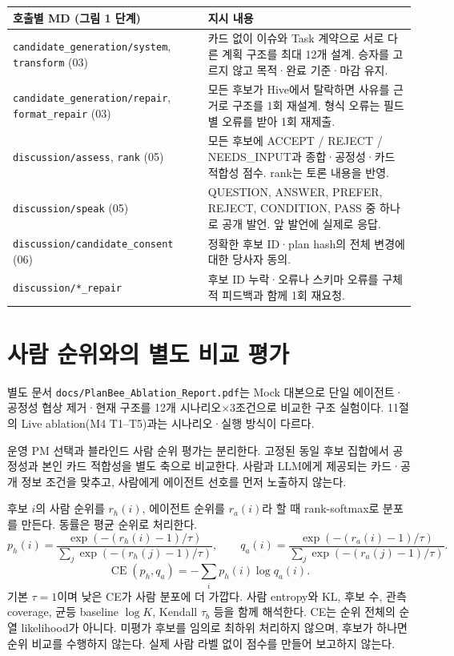 \documentclass[11pt,a4paper]{article}
\begin{document}
\vspace{4mm}
\begin{tabularx}{\linewidth}{@{}p{52mm}Y@{}}\toprule
호출별 MD (그림 1 단계) & 지시 내용\\\midrule
\texttt{candidate\_generation/system}, \texttt{transform} (03) & 카드 없이 이슈와 Task 계약으로 서로 다른 계획 구조를 최대 12개 설계. 승자를 고르지 않고 목적·완료 기준·마감 유지.\\
\texttt{candidate\_generation/repair}, \texttt{format\_repair} (03) & 모든 후보가 Hive에서 탈락하면 사유를 근거로 구조를 1회 재설계. 형식 오류는 필드별 오류를 받아 1회 재제출.\\
\texttt{discussion/assess}, \texttt{rank} (05) & 모든 후보에 ACCEPT / REJECT / NEEDS\_INPUT과 종합·공정성·카드 적합성 점수. rank는 토론 내용을 반영.\\
\texttt{discussion/speak} (05) & QUESTION, ANSWER, PREFER, REJECT, CONDITION, PASS 중 하나로 공개 발언. 앞 발언에 실제로 응답.\\
\texttt{discussion/candidate\_consent} (06) & 정확한 후보 ID·plan hash의 전체 변경에 대한 당사자 동의.\\
\texttt{discussion/*\_repair} & 후보 ID 누락·오류나 스키마 오류를 구체적 피드백과 함께 1회 재요청.\\\bottomrule
\end{tabularx}

\newpage
\section{사람 순위와의 별도 비교 평가}
{\small 별도 문서 \texttt{docs/PlanBee\_Ablation\_Report.pdf}는 Mock 대본으로 단일 에이전트·공정성 협상 제거·현재 구조를 12개 시나리오×3조건으로 비교한 구조 실험이다. 11절의 Live ablation(M4 T1--T5)과는 시나리오·실행 방식이 다르다.}


운영 PM 선택과 블라인드 사람 순위 평가는 분리한다. 고정된 동일 후보 집합에서 공정성과 본인 카드 적합성을 별도 축으로 비교한다. 사람과 LLM에게 제공되는 카드·공개 정보 조건을 맞추고, 사람에게 에이전트 선호를 먼저 노출하지 않는다.

후보 $i$의 사람 순위를 $r_h(i)$, 에이전트 순위를 $r_a(i)$라 할 때 rank-softmax로 분포를 만든다. 동률은 평균 순위로 처리한다.
\[
p_h(i)=\frac{\exp(-(r_h(i)-1)/\tau)}{\sum_j\exp(-(r_h(j)-1)/\tau)},\qquad
q_a(i)=\frac{\exp(-(r_a(i)-1)/\tau)}{\sum_j\exp(-(r_a(j)-1)/\tau)}.
\]
\[
\operatorname{CE}(p_h,q_a)=-\sum_i p_h(i)\log q_a(i).
\]
기본 $\tau=1$이며 낮은 CE가 사람 분포에 더 가깝다. 사람 entropy와 KL, 후보 수, 관측 coverage, 균등 baseline $\log K$, Kendall $\tau_b$ 등을 함께 해석한다. CE는 순위 전체의 순열 likelihood가 아니다. 미평가 후보를 임의로 최하위 처리하지 않으며, 후보가 하나면 순위 비교를 수행하지 않는다. 실제 사람 라벨 없이 점수를 만들어 보고하지 않는다.
\end{document}
